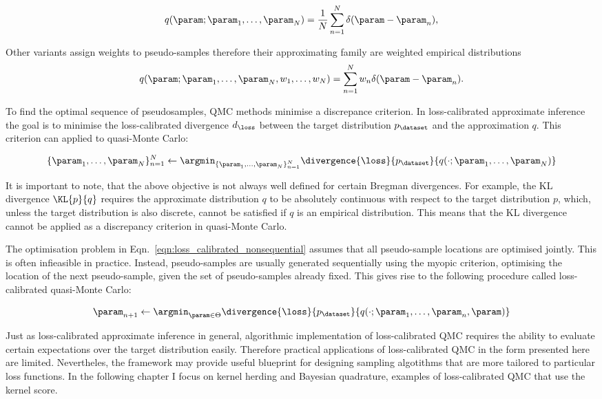 \begin{equation}
	q(\param ; \param_1,\ldots,\param_N) = \frac{1}{N} \sum_{n=1}^{N} \delta(\param - \param_n)\mbox{,}
\end{equation}

Other variants assign weights to pseudo-samples therefore their approximating family are weighted empirical distributions
\begin{equation}
	q(\param ; \param_1,\ldots,\param_N,w_1,\ldots,w_N) = \sum_{n=1}^{N} w_n \delta(\param - \param_n)\mbox{.}
\end{equation}

To find the optimal sequence of pseudosamples, QMC methods minimise a discrepance criterion. In loss-calibrated approximate inference the goal is to minimise the loss-calibrated divergence $d_\loss$ between the target distribution $p_\dataset$ and the approximation $q$. This criterion can applied to quasi-Monte Carlo:

\begin{equation}
	\{\param_1,\ldots,\param_N\}_{n=1}^{N} \leftarrow \argmin_{\{\param_1,\ldots,\param_N\}_{n=1}^{N}} \divergence{\loss}{p_\dataset}{q(\cdot ; \param_1,\ldots,\param_N)} \label{eqn:loss_calibrated_nonsequential}
\end{equation}

It is important to note, that the above objective is not always well defined for certain Bregman divergences. For example, the KL divergence $\KL{p}{q}$ requires the approximate distribution $q$ to be absolutely continuous with respect to the target distribution $p$, which, unless the target distribution is also discrete, cannot be satisfied if $q$ is an empirical distribution. This means that the KL divergence cannot be applied as a discrepancy criterion in quasi-Monte Carlo.

The optimisation problem in Eqn.\ \ref{eqn:loss_calibrated_nonsequential} assumes that all pseudo-sample locations are optimised jointly. This is often infieasible in practice. Instead, pseudo-samples are usually generated sequentially using the myopic criterion, optimising the location of the next pseudo-sample, given the set of pseudo-samples already fixed. This gives rise to the following procedure called loss-calibrated quasi-Monte Carlo:

\begin{equation}
	\param_{n+1} \leftarrow \argmin_{\param \in \Theta} \divergence{\loss}{p_\dataset}{q(\cdot ; \param_1,\ldots,\param_{n},\param)} \label{eqn:loss_calibrated_sequential}
\end{equation}

Just as loss-calibrated approximate inference in general, algorithmic implementation of loss-calibrated QMC requires the ability to evaluate certain expectations over the target distribution easily. Therefore practical applications of loss-calibrated QMC in the form presented here are limited. Nevertheles, the framework may provide useful blueprint for designing sampling algotithms that are more tailored to particular loss functions. In the following chapter I focus on kernel herding and Bayesian quadrature, examples of loss-calibrated QMC that use the kernel score.
